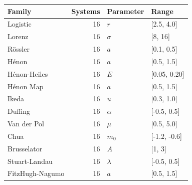 \begin{tabular}{lrll}
\toprule
Family & Systems & Parameter & Range \\
\midrule
Logistic & 16 & $r$ & [2.5, 4.0] \\
Lorenz & 16 & $\sigma$ & [8, 16] \\
Rössler & 16 & $a$ & [0.1, 0.5] \\
Hénon & 16 & $a$ & [0.5, 1.5] \\
Hénon-Heiles & 16 & $E$ & [0.05, 0.20] \\
Hénon Map & 16 & $a$ & [0.5, 1.5] \\
Ikeda & 16 & $u$ & [0.3, 1.0] \\
Duffing & 16 & $\alpha$ & [-0.5, 0.5] \\
Van der Pol & 16 & $\mu$ & [0.5, 5.0] \\
Chua & 16 & $m_0$ & [-1.2, -0.6] \\
Brusselator & 16 & $A$ & [1, 3] \\
Stuart-Landau & 16 & $\lambda$ & [-0.5, 0.5] \\
FitzHugh-Nagumo & 16 & $a$ & [0.5, 1.5] \\
\bottomrule
\end{tabular}
